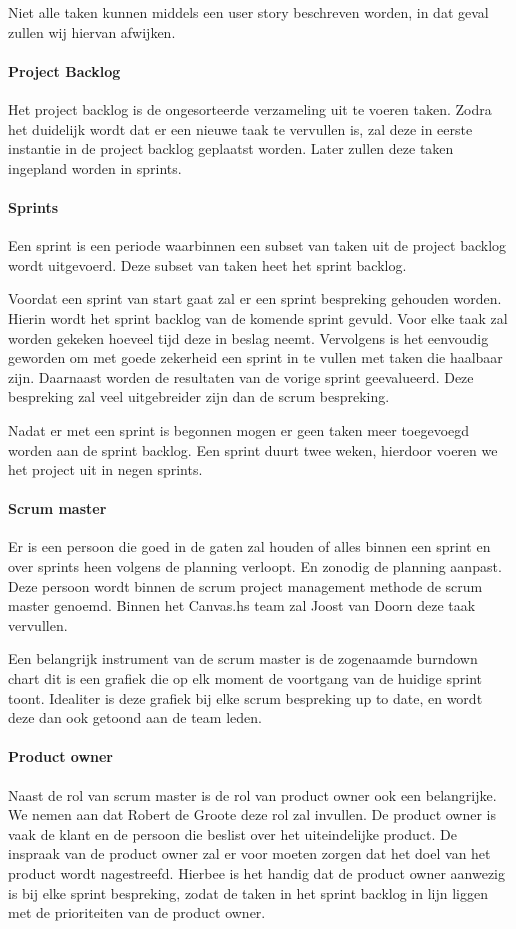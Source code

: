 Niet alle taken kunnen middels een user story beschreven worden, in dat geval zullen wij hiervan afwijken.
\paragraph{Project Backlog}
Het project backlog is de ongesorteerde verzameling uit te voeren taken. Zodra het duidelijk wordt dat er een nieuwe taak te vervullen is, zal deze in eerste instantie in de project backlog geplaatst worden. Later zullen deze taken ingepland worden in sprints.

\paragraph{Sprints}
Een sprint is een periode waarbinnen een subset van taken uit de project backlog wordt uitgevoerd. Deze subset van taken heet het sprint backlog.

Voordat een sprint van start gaat zal er een sprint bespreking gehouden worden. Hierin wordt het sprint backlog van de komende sprint gevuld. Voor elke taak zal worden gekeken hoeveel tijd deze in beslag neemt. Vervolgens is het eenvoudig geworden om met goede zekerheid een sprint in te vullen met taken die haalbaar zijn. Daarnaast worden de resultaten van de vorige sprint geevalueerd. Deze bespreking zal veel uitgebreider zijn dan de scrum bespreking.

Nadat er met een sprint is begonnen mogen er geen taken meer toegevoegd worden aan de sprint backlog. Een sprint duurt twee weken, hierdoor voeren we het project uit in negen sprints.

\paragraph{Scrum master} 
Er is een persoon die goed in de gaten zal houden of alles binnen een sprint en over sprints heen volgens de planning verloopt. En zonodig de planning aanpast. Deze persoon wordt binnen de scrum project management methode de scrum master genoemd. Binnen het Canvas.hs team zal Joost van Doorn deze taak vervullen.

Een belangrijk instrument van de scrum master is de zogenaamde burndown chart dit is een grafiek die op elk moment de voortgang van de huidige sprint toont. Idealiter is deze grafiek bij elke scrum bespreking up to date, en wordt deze dan ook getoond aan de team leden.

\paragraph{Product owner} 
Naast de rol van scrum master is de rol van product owner ook een belangrijke. We nemen aan dat Robert de Groote deze rol zal invullen. De product owner is vaak de klant en de persoon die beslist over het uiteindelijke product. De inspraak van de product owner zal er voor moeten zorgen dat het doel van het product wordt nagestreefd. Hierbee is het handig dat de product owner aanwezig is bij elke sprint bespreking, zodat de taken in het sprint backlog in lijn liggen met de prioriteiten van de product owner.


